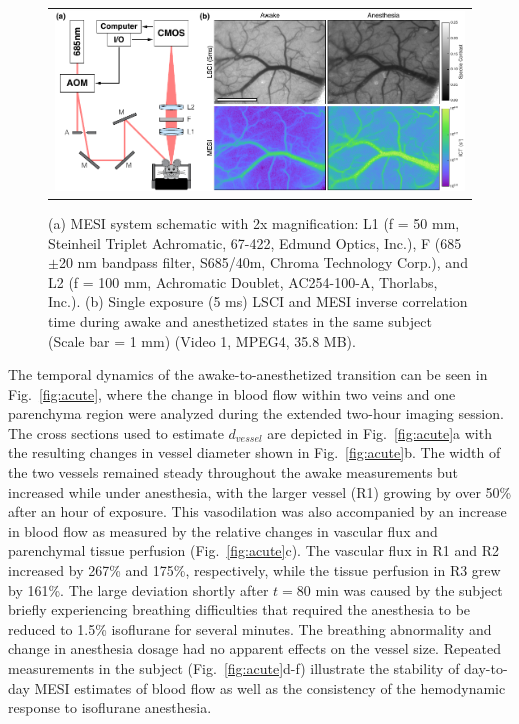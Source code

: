 \documentclass[12pt]{spieman}
\begin{document}
\begin{spacing}{2}
\begin{figure}
    \begin{center}
        \begin{tabular}{c}
            \includegraphics[width=6.25in]{Figure1.pdf}
        \end{tabular}
    \end{center}
    \caption {
        \label{fig:system_image}
        (a) MESI system schematic with 2x magnification: L1 (f = 50 mm, Steinheil Triplet Achromatic, 67-422, Edmund Optics, Inc.), F (685$\pm$20 nm bandpass filter, S685/40m, Chroma Technology Corp.), and L2 (f = 100 mm, Achromatic Doublet, AC254-100-A, Thorlabs, Inc.). (b) Single exposure (5 ms) LSCI and MESI inverse correlation time during awake and anesthetized states in the same subject (Scale bar = 1 mm) (Video 1, MPEG4, 35.8 MB).
    }
\end{figure}

The temporal dynamics of the awake-to-anesthetized transition can be seen in Fig.~\ref{fig:acute}, where the change in blood flow within two veins and one parenchyma region were analyzed during the extended two-hour imaging session. The cross sections used to estimate $d_{vessel}$ are depicted in Fig.~\ref{fig:acute}a with the resulting changes in vessel diameter shown in Fig.~\ref{fig:acute}b. The width of the two vessels remained steady throughout the awake measurements but increased while under anesthesia, with the larger vessel (R1) growing by over 50\% after an hour of exposure. This vasodilation was also accompanied by an increase in blood flow as measured by the relative changes in vascular flux and parenchymal tissue perfusion (Fig.~\ref{fig:acute}c). The vascular flux in R1 and R2 increased by 267\% and 175\%, respectively, while the tissue perfusion in R3 grew by 161\%. The large deviation shortly after $t = 80$ min was caused by the subject briefly experiencing breathing difficulties that required the anesthesia to be reduced to 1.5\% isoflurane for several minutes. The breathing abnormality and change in anesthesia dosage had no apparent effects on the vessel size. Repeated measurements in the subject (Fig.~\ref{fig:acute}d-f) illustrate the stability of day-to-day MESI estimates of blood flow as well as the consistency of the hemodynamic response to isoflurane anesthesia.


\end{spacing}
\end{document}
